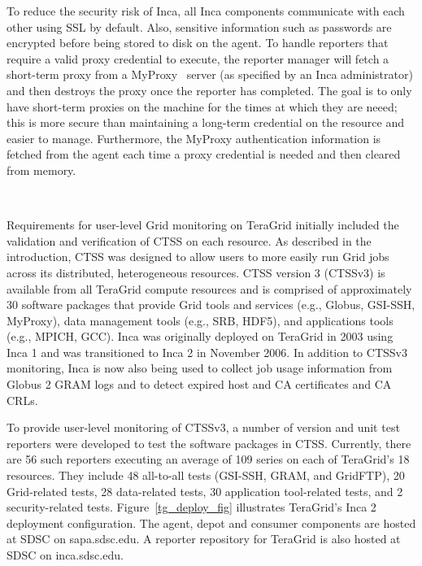 \documentclass[times,10pt,twocolumn]{article}
\begin{document}

To reduce the security risk of Inca, all Inca components communicate with each
other using SSL by default.  Also, sensitive information such as passwords are
encrypted before being stored to disk on the agent.  To handle reporters that
require a valid proxy credential to execute, the reporter manager will fetch a
short-term proxy from a MyProxy~\cite{myproxy} server (as specified by an Inca
administrator) and then destroys the proxy once the reporter has completed.
The goal is to only have short-term proxies on the machine for the times at
which they are neeed; this is more secure than maintaining a long-term
credential on the resource and easier to manage.  Furthermore, the MyProxy
authentication information is fetched from the agent each time a proxy
credential is needed and then cleared from memory.


~\newpage

\label{usecases}


Requirements for user-level Grid monitoring on TeraGrid initially included the
validation and verification of CTSS on each resource.  As described in the
introduction, CTSS was designed to
allow users to more easily run Grid jobs across its distributed, heterogeneous
resources.  CTSS version 3 (CTSSv3) is available from all TeraGrid compute
resources and is comprised of approximately 30 software packages that provide
Grid tools and services (e.g., Globus, GSI-SSH, MyProxy), data management
tools (e.g., SRB, HDF5), and applications tools (e.g., MPICH, GCC).
Inca was originally
deployed on TeraGrid in 2003 using Inca 1 and was transitioned to Inca 2 in
November 2006.  In addition to CTSSv3 monitoring, Inca is now also being used
to collect job usage information from Globus 2 GRAM logs and to detect expired
host and CA certificates and CA CRLs. 

To provide user-level monitoring of CTSSv3, a number of version and unit
test reporters were developed to test the software packages in CTSS.
Currently, there are 56 such reporters executing an average of 109 series on
each of TeraGrid's 18 resources.  They include 48 all-to-all tests (GSI-SSH,
GRAM, and GridFTP), 20 Grid-related tests, 28 data-related tests, 30
application tool-related tests, and 2 security-related tests.  
Figure~\ref{tg_deploy_fig} illustrates TeraGrid's Inca 2 deployment
configuration.  The
agent, depot and consumer components are hosted at SDSC on 
sapa.sdsc.edu.  A reporter repository for TeraGrid is also hosted
at SDSC on inca.sdsc.edu.  
\end{document}
